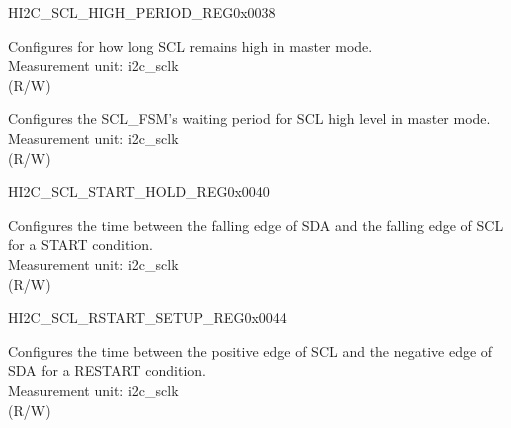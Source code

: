 \begin{register}{H}{I2C\_SCL\_HIGH\_PERIOD\_REG}{0x0038}\label{regdesc:I2CSCLHIGHPERIODREG}
%
%
%
\regnewline%
\begin{regdesc}\begin{reglist}
\label{fielddesc:I2CSCLHIGHPERIOD}\item [I2C\_SCL\_HIGH\_PERIOD] Configures for how long SCL remains high in master mode.\\
Measurement unit: i2c\_sclk \\ (R/W)
\label{fielddesc:I2CSCLWAITHIGHPERIOD}\item [I2C\_SCL\_WAIT\_HIGH\_PERIOD] Configures the SCL\_FSM's waiting period for SCL high level in master mode.\\
Measurement unit: i2c\_sclk \\ (R/W)
\end{reglist}\end{regdesc}
\end{register}


\begin{register}{H}{I2C\_SCL\_START\_HOLD\_REG}{0x0040}\label{regdesc:I2CSCLSTARTHOLDREG}
%
%
\regnewline%
\begin{regdesc}\begin{reglist}
\label{fielddesc:I2CSCLSTARTHOLDTIME}\item [I2C\_SCL\_START\_HOLD\_TIME] Configures the time between the falling edge of SDA and the falling edge of SCL for a START condition.\\
Measurement unit: i2c\_sclk \\ (R/W)
\end{reglist}\end{regdesc}
\end{register}


\begin{register}{H}{I2C\_SCL\_RSTART\_SETUP\_REG}{0x0044}\label{regdesc:I2CSCLRSTARTSETUPREG}
%
%
\regnewline%
\begin{regdesc}\begin{reglist}
\label{fielddesc:I2CSCLRSTARTSETUPTIME}\item [I2C\_SCL\_RSTART\_SETUP\_TIME] Configures the time between the positive edge of SCL and the negative edge of SDA for a RESTART condition.\\
Measurement unit: i2c\_sclk \\ (R/W)
\end{reglist}\end{regdesc}
\end{register}


